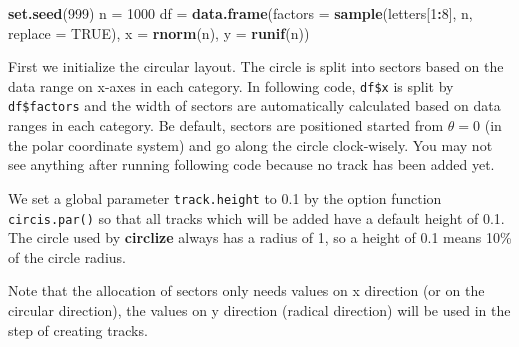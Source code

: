 \documentclass[]{book}
\newenvironment{Shaded}{\begin{snugshade}}{\end{snugshade}}
\newcommand{\KeywordTok}[1]{\textcolor[rgb]{0.13,0.29,0.53}{\textbf{#1}}}
\newcommand{\DataTypeTok}[1]{\textcolor[rgb]{0.13,0.29,0.53}{#1}}
\newcommand{\DecValTok}[1]{\textcolor[rgb]{0.00,0.00,0.81}{#1}}
\newcommand{\FloatTok}[1]{\textcolor[rgb]{0.00,0.00,0.81}{#1}}
\newcommand{\StringTok}[1]{\textcolor[rgb]{0.31,0.60,0.02}{#1}}
\newcommand{\OtherTok}[1]{\textcolor[rgb]{0.56,0.35,0.01}{#1}}
\newcommand{\OperatorTok}[1]{\textcolor[rgb]{0.81,0.36,0.00}{\textbf{#1}}}
\newcommand{\NormalTok}[1]{#1}
\theoremstyle{definition}
\theoremstyle{definition}
\theoremstyle{remark}
\begin{document}
\begin{Shaded}
\begin{Highlighting}[]
\KeywordTok{set.seed}\NormalTok{(}\DecValTok{999}\NormalTok{)}
\NormalTok{n =}\StringTok{ }\DecValTok{1000}
\NormalTok{df =}\StringTok{ }\KeywordTok{data.frame}\NormalTok{(}\DataTypeTok{factors =} \KeywordTok{sample}\NormalTok{(letters[}\DecValTok{1}\OperatorTok{:}\DecValTok{8}\NormalTok{], n, }\DataTypeTok{replace =} \OtherTok{TRUE}\NormalTok{),}
    \DataTypeTok{x =} \KeywordTok{rnorm}\NormalTok{(n), }\DataTypeTok{y =} \KeywordTok{runif}\NormalTok{(n))}
\end{Highlighting}
\end{Shaded}

First we initialize the circular layout. The circle is split into
sectors based on the data range on x-axes in each category. In following
code, \texttt{df\$x} is split by \texttt{df\$factors} and the width of
sectors are automatically calculated based on data ranges in each
category. Be default, sectors are positioned started from \(\theta = 0\)
(in the polar coordinate system) and go along the circle clock-wisely.
You may not see anything after running following code because no track
has been added yet.

\begin{Shaded}
\end{Shaded}

We set a global parameter \texttt{track.height} to 0.1 by the option
function \texttt{circis.par()} so that all tracks which will be added
have a default height of 0.1. The circle used by \textbf{circlize}
always has a radius of 1, so a height of 0.1 means 10\% of the circle
radius.

Note that the allocation of sectors only needs values on x direction (or
on the circular direction), the values on y direction (radical
direction) will be used in the step of creating tracks.
\end{document}
